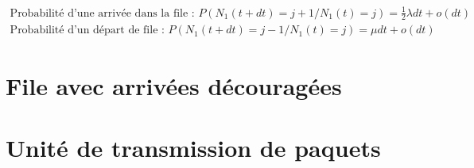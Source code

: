 \documentclass[12pt, a4paper]{article}
\begin{document}
\begin{align*}
\text{Probabilit\'e d'une arriv\'ee dans la file : } P(N_{1}(t+dt)=j+1 / N_{1}(t)=j)=\frac{1}{2}\lambda dt + o(dt) \\
\text{Probabilit\'e d'un d\'epart de file : } P(N_{1}(t+dt)=j-1 / N_{1}(t)=j)=\mu dt + o(dt)
\end{align*}

\newpage

\section*{File avec arriv\'ees d\'ecourag\'ees}

\newpage

\section*{Unit\'e de transmission de paquets}
\end{document}
